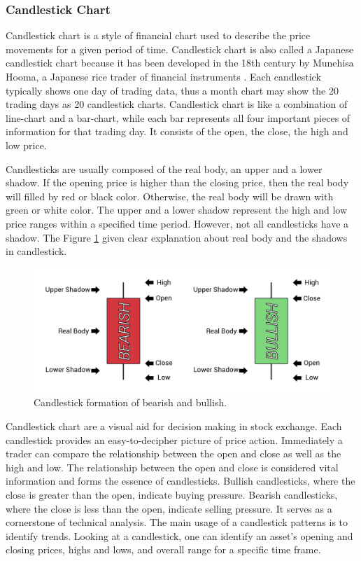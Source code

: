 \documentclass[10pt,twocolumn]{article}
\begin{document}
\subsubsection{Candlestick Chart}
Candlestick chart is a style of financial chart used to describe the price movements for a given period of time. Candlestick chart is also called a Japanese candlestick chart because it has been developed in the 18th century by Munehisa Hooma, a Japanese rice trader of financial instruments \cite{morris2006candlestick}. Each candlestick typically shows one day of trading data, thus a month chart may show the 20 trading days as 20 candlestick charts. Candlestick chart is like a combination of line-chart and a bar-chart, while each bar represents all four important pieces of information for that trading day. It consists of the open, the close, the high and low price.
\par
Candlesticks are usually composed of the real body, an upper and a lower shadow. If the opening price is higher than the closing price, then the real body will filled by red or black color. Otherwise, the real body will be drawn with green or white color. The upper and a lower shadow represent the high and low price ranges within a specified time period. However, not all candlesticks have a shadow. The Figure \ref{fig:candlestickformation} given clear explanation about real body and the shadows in candlestick.
\begin{figure}
  \includegraphics[width=\linewidth]{figures/candlestick_formation.png}
  \caption{Candlestick formation of bearish and bullish.}
  \label{fig:candlestickformation}
\end{figure}
\par
Candlestick chart are a visual aid for decision making in stock exchange. Each candlestick provides an easy-to-decipher picture of price action. Immediately a trader can compare the relationship between the open and close as well as the high and low. The relationship between the open and close is considered vital information and forms the essence of candlesticks. Bullish candlesticks, where the close is greater than the open, indicate buying pressure. Bearish candlesticks, where the close is less than the open, indicate selling pressure. It serves as a cornerstone of technical analysis. The main usage of a candlestick patterns is to identify trends. Looking at a candlestick, one can identify an asset’s opening and closing prices, highs and lows, and overall range for a specific time frame\cite{lu2012profitable}.
\end{document}
